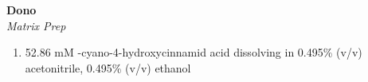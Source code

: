 \textbf{Dono} 
\\
\textit{Matrix Prep}
\begin{enumerate}
\item{52.86 mM \alpha-cyano-4-hydroxycinnamid acid dissolving in 0.495\% (v/v) acetonitrile, 0.495\% (v/v) ethanol \+ }
\end{enumerate}
